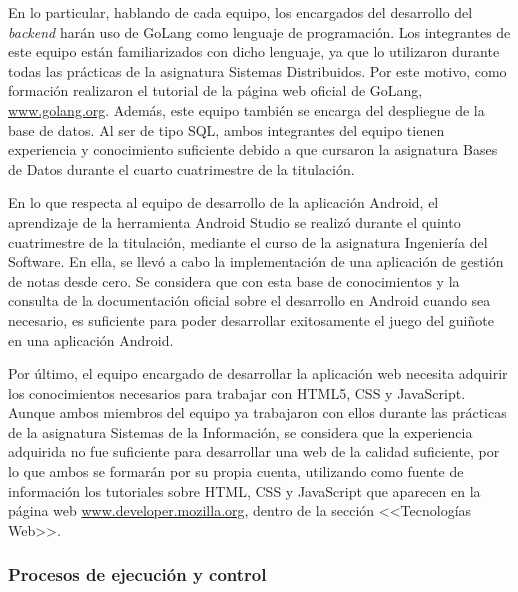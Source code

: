 \documentclass{article}
\begin{document}
En lo particular, hablando de cada equipo, los encargados del desarrollo del \textit{backend} harán uso de GoLang como lenguaje de programación. Los integrantes de este equipo están familiarizados con dicho lenguaje, ya que lo utilizaron durante todas las prácticas de la asignatura Sistemas Distribuidos. Por este motivo, como formación realizaron el tutorial de la página web oficial de GoLang, \href{www.golang.org}{www.golang.org}.
Además, este equipo también se encarga del despliegue de la base de datos. Al ser de tipo SQL, ambos integrantes del equipo tienen experiencia y conocimiento suficiente debido a que cursaron la asignatura Bases de Datos durante el cuarto cuatrimestre de la titulación.

En lo que respecta al equipo de desarrollo de la aplicación Android, el aprendizaje de la herramienta Android Studio se realizó durante el quinto cuatrimestre de la titulación, mediante el curso de la asignatura Ingeniería del Software. En ella, se llevó a cabo la implementación de una aplicación de gestión de notas desde cero. Se considera que con esta base de
conocimientos y la consulta de la documentación oficial sobre el desarrollo en Android cuando sea necesario, es suficiente para poder desarrollar exitosamente el juego del guiñote en una aplicación Android.

Por último, el equipo encargado de desarrollar la aplicación web necesita adquirir los conocimientos necesarios para trabajar con HTML5, CSS y JavaScript. Aunque ambos miembros del equipo ya trabajaron con ellos durante las prácticas de la asignatura Sistemas de la Información, se considera que la experiencia adquirida no fue suficiente para desarrollar una web de la calidad suficiente, por lo que
ambos se formarán por su propia cuenta, utilizando como fuente de información los tutoriales sobre HTML, CSS y JavaScript que aparecen en la página web \href{www.developer.mozilla.org}{www.developer.mozilla.org}, dentro de la sección <<Tecnologías Web>>.


\subsubsection{Procesos de ejecución y control}

\end{document}
